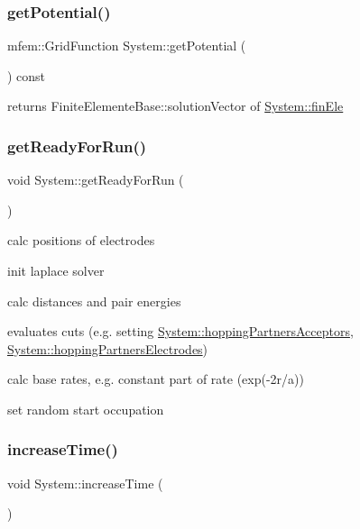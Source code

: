 \subsubsection{\texorpdfstring{get\+Potential()}{getPotential()}}
{\footnotesize\ttfamily mfem\+::\+Grid\+Function System\+::get\+Potential (\begin{DoxyParamCaption}{ }\end{DoxyParamCaption}) const}

returns Finite\+Elemente\+Base\+::solution\+Vector of \hyperlink{classSystem_a586a959bbcb019f061535e63d7a96852}{System\+::fin\+Ele} \mbox{\label{classSystem_a943bc42d8dc42ae1aaf1a5798ce723b8}} 
\subsubsection{\texorpdfstring{get\+Ready\+For\+Run()}{getReadyForRun()}}
{\footnotesize\ttfamily void System\+::get\+Ready\+For\+Run (\begin{DoxyParamCaption}{ }\end{DoxyParamCaption})}


\begin{DoxyItemize}
\item calc positions of electrodes
\item init laplace solver
\item calc distances and pair energies
\item evaluates cuts (e.\+g. setting \hyperlink{classSystem_ae9ca6aa54468effc1fae57c2adc6c578}{System\+::hopping\+Partners\+Acceptors}, \hyperlink{classSystem_a777232d4fec6f13fc7423a477f629a0f}{System\+::hopping\+Partners\+Electrodes})
\item calc base rates, e.\+g. constant part of rate (exp(-\/2r/a))
\item set random start occupation 
\end{DoxyItemize}\mbox{\label{classSystem_a6167b888fa30f9d8fa56a246c5f461b9}} 
\subsubsection{\texorpdfstring{increase\+Time()}{increaseTime()}}
{\footnotesize\ttfamily void System\+::increase\+Time (\begin{DoxyParamCaption}{ }\end{DoxyParamCaption})\hspace{0.3cm}{\ttfamily [private]}}

